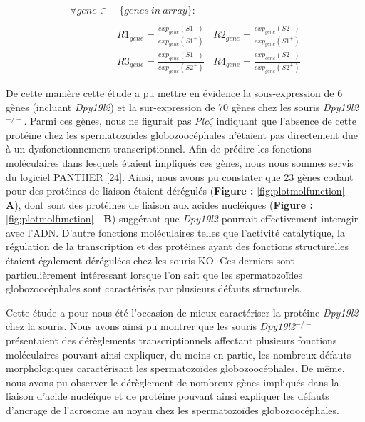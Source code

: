 \documentclass[12pt,twoside]{ugathesis}
\begin{document}
\begin{equation} 
\begin{split}
\forall gene \in & \ \{genes\ in\ array\}: \\
\\
& R1_{gene} = \frac{exp_{gene}(S1^-)}{exp_{gene}(S1^+)} \ \ \ \ R2_{gene} = \frac{exp_{gene}(S2^-)}{exp_{gene}(S1^+)} \\
& R3_{gene} = \frac{exp_{gene}(S1^-)}{exp_{gene}(S2^+)} \ \ \ \ R4_{gene} = \frac{exp_{gene}(S2^-)}{exp_{gene}(S2^+)} 
\label{eq:micerate}
\end{split}
\end{equation}

De cette manière cette étude a pu mettre en évidence la sous-expression
de 6 gènes (incluant \emph{Dpy19l2}) et la sur-expression de 70 gènes
chez les souris \emph{Dpy19l2}\(^{-/-}\). Parmi ces gènes, nous ne
figurait pas \emph{Plc}\(\zeta\) indiquant que l'absence de cette
protéine chez les spermatozoïdes globozoocéphales n'étaient pas
directement due à un dysfonctionnement transcriptionnel. Afin de prédire
les fonctions moléculaires dans lesquels étaient impliqués ces gènes,
nous nous sommes servis du logiciel PANTHER
{[}\protect\hyperlink{ref-Mi2017}{24}{]}. Ainsi, nous avons pu constater
que 23 gènes codant pour des protéines de liaison étaient dérégulés
(\textbf{Figure : }\ref{fig:plotmolfunction} - \textbf{A}), dont sont
des protéines de liaison aux acides nucléiques (\textbf{Figure :
}\ref{fig:plotmolfunction} - \textbf{B}) suggérant que \emph{Dpy19l2}
pourrait effectivement interagir avec l'ADN. D'autre fonctions
moléculaires telles que l'activité catalytique, la régulation de la
transcription et des protéines ayant des fonctions structurelles étaient
également dérégulées chez les souris KO. Ces derniers sont
particulièrement intéressant lorsque l'on sait que les spermatozoïdes
globozoocéphales sont caractérisés par plusieurs défauts structurels.

Cette étude a pour nous été l'occasion de mieux caractériser la protéine
\emph{Dpy19l2} chez la souris. Nous avons ainsi pu montrer que les
souris \emph{Dpy19l2}\(^{-/-}\) présentaient des dérèglements
transcriptionnels affectant plusieurs fonctions moléculaires pouvant
ainsi expliquer, du moins en partie, les nombreux défauts morphologiques
caractérisant les spermatozoïdes globozoocéphales. De même, nous avons
pu observer le dérèglement de nombreux gènes impliqués dans la liaison
d'acide nucléique et de protéine pouvant ainsi expliquer les défauts
d'ancrage de l'acrosome au noyau chez les spermatozoïdes
globozoocéphales.
\end{document}
